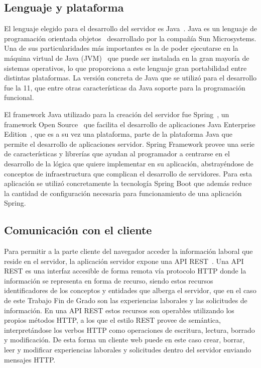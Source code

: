 \documentclass[a4paper, 12pt]{book}
\begin{document}
    \subsection{Lenguaje y plataforma}
    \label{subsec:intro_applicationserver_languageandplatform}

    El lenguaje elegido para el desarrollo del servidor es Java~\cite{bib:java}. Java es un lenguaje de programación orientada objetos~\cite{bib:oop} desarrollado por la compañía Sun Microsystems.
    Una de sus particularidades más importantes es la de poder ejecutarse en la máquina virtual de Java (JVM)~\cite{bib:jvm} que puede ser instalada en la gran mayoría de sistemas operativos,
    lo que proporciona a este lenguaje gran portabilidad entre distintas plataformas. La versión concreta de Java que se utilizó para el desarrollo fue la 11, que entre otras características da Java soporte para la programación funcional.

    El framework Java utilizado para la creación del servidor fue Spring~\cite{bib:spring}, un framework Open Source~\cite{bib:opensource} que facilita el desarrollo de aplicaciones Java Enterprise Edition~\cite{bib:javaee}, que es a su vez una plataforma, parte de la plataforma Java que permite el desarrollo de aplicaciones servidor.
    Spring Framework provee una serie de características y librerías que ayudan al programador a centrarse en el desarrollo de la lógica que quiere implementar en su aplicación, abstrayéndose de conceptos de infraestructura que complican el desarrollo de servidores.
    Para esta aplicación se utilizó concretamente la tecnología Spring Boot que además reduce la cantidad de configuración necesaria para funcionamiento de una aplicación Spring.

    \subsection{Comunicación con el cliente}
    \label{subsec:intro_applicationserver_communicationwithclient}

    Para permitir a la parte cliente del navegador acceder la información laboral que reside en el servidor, la aplicación servidor expone una API REST~\cite{bib:apirest}.
    Una API REST es una interfaz accesible de forma remota vía protocolo HTTP donde la información se representa en forma de recurso, siendo estos recursos identificadores de los conceptos y entidades que alberga el servidor, que en el caso de este Trabajo Fin de Grado son las experiencias laborales y las solicitudes de información.
    En una API REST estos recursos son operables utilizando los propios métodos HTTP, a los que el estilo REST provee de semántica, interpretándose los verbos HTTP como operaciones de escritura, lectura, borrado y modificación. De esta forma un cliente web puede en este caso crear, borrar, leer y modificar experiencias laborales y solicitudes dentro del servidor enviando mensajes HTTP.
\end{document}

